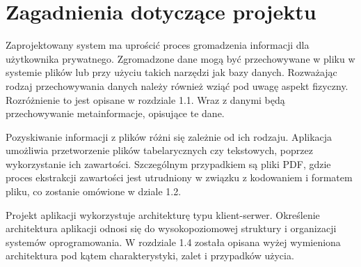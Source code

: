 \documentclass[12pt,a4paper,twoside]{article}
\begin{document}
\section{Zagadnienia dotyczące projektu}
Zaprojektowany system ma uprościć proces gromadzenia informacji dla użytkownika prywatnego. Zgromadzone dane mogą być przechowywane w pliku w systemie plików lub przy użyciu takich narzędzi jak bazy danych. Rozważając rodzaj przechowywania danych należy również wziąć pod uwagę aspekt fizyczny. Rozróżnienie to jest opisane w rozdziale 1.1. Wraz z danymi będą przechowywanie metainformacje, opisujące te dane.  \par
Pozyskiwanie informacji z plików różni się zależnie od ich rodzaju. Aplikacja umożliwia przetworzenie plików tabelarycznych czy tekstowych, poprzez wykorzystanie ich zawartości. Szczególnym przypadkiem są pliki PDF, gdzie proces ekstrakcji zawartości jest utrudniony w związku z kodowaniem i formatem pliku, co zostanie omówione w dziale 1.2. \par
Projekt aplikacji wykorzystuje architekturę typu klient-serwer. Określenie architektura aplikacji odnosi się do wysokopoziomowej struktury i organizacji systemów oprogramowania. W rozdziale 1.4 została opisana wyżej wymieniona architektura pod kątem charakterystyki, zalet i przypadków użycia. 
\end{document}
